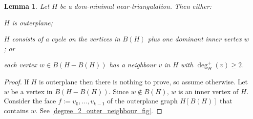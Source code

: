 \documentclass[12pt]{article}
\newtheorem{lem}{Lemma}
\theoremstyle{definition}
\begin{document}
\begin{lem}\label{degree_2_outer_neighbour}
  Let $H$ be a dom-minimal near-triangulation. Then either:
  \begin{compactenum}
    \item $H$ is outerplane;
    \item $H$ consists of a cycle on the vertices in $B(H)$ plus one dominant inner vertex $w$; or
    \item each vertex $w\in B(H-B(H))$ has a neighbour $v$ in $H$ with $\deg^+_H(v)\ge 2$.
  \end{compactenum}
\end{lem}

\begin{proof}
   If $H$ is outerplane then there is nothing to prove, so assume otherwise. Let $w$ be a vertex in $B(H-B(H))$. Since $w\not\in B(H)$, $w$ is an inner vertex of $H$. Consider the face $f:=v_0,\ldots,v_{k-1}$ of the outerplane graph $H[B(H)]$ that contains $w$. See \cref{degree_2_outer_neighbour_fig}.


\end{proof}
\end{document}
